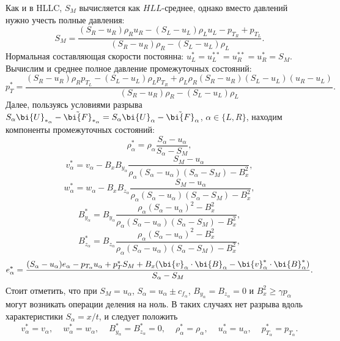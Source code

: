 \documentclass[12pt, a4paper]{article}
\begin{document}
 	Как и в HLLC, $S_M$ вычисляется как $HLL$-среднее, однако вместо давлений нужно учесть полные давления:
 	\[
 		S_M = 
 	\dfrac{(S_R - u_R)\rho_Ru_R - (S_L - u_L)\rho_Lu_L - p_{T_R} +p_{T_L}}{(S_R - u_R)\rho_R-(S_L - u_L)\rho_L}.
 	\]
 	Нормальная составляющая скорости постоянна: $u_L^* = u_L^{**} = u_R^{**} = u_R^* = S_M$. Вычислим и среднее полное давление промежуточных состояний:
 	\[
 	p_T^* = \dfrac{(S_R-u_R)\rho_Rp_{T_L} - (S_L-u_L)\rho_Lp_{T_R} +\rho_L\rho_R(S_R-u_R)(S_L-u_L)(u_R-u_L) }{(S_R-u_R)\rho_R-(S_L-u_L)\rho_L}.
 	\]
 	Далее, пользуясь условиями разрыва $S_\alpha\bi{U}_{*_\alpha} - \tilde{\bi{F}}_{*_\alpha} = S_\alpha\bi{U}_{\alpha} - \tilde{\bi{F}}_{\alpha}$, $\alpha\in\{L,R\}$, находим компоненты промежуточных состояний:
 	\[
 	\rho^*_\alpha = \rho_\alpha\dfrac{S_\alpha-u_\alpha}{S_\alpha-S_M},
 	\]
 	\[
 	v_\alpha^* = v_\alpha - B_xB_{y_\alpha}\dfrac{ S_M - u_\alpha }{ \rho_\alpha(S_\alpha -u_\alpha)(S_\alpha-S_M) - B_x^2 },
 	\]
 	\[
 	w_\alpha^* = w_\alpha - B_xB_{z_\alpha}\dfrac{ S_M - u_\alpha }{ \rho_\alpha(S_\alpha -u_\alpha)(S_\alpha-S_M) - B_x^2 },
 	\]
 	\[
 	B_{y_\alpha}^* = B_{y_\alpha} \dfrac{ \rho_\alpha(S_\alpha-u_\alpha)^2-B_x^2 }{\rho_\alpha(S_\alpha -u_\alpha)(S_\alpha-S_M) - B_x^2 },
 	\]
 		\[
 	B_{z_\alpha}^* = B_{z_\alpha} \dfrac{ \rho_\alpha(S_\alpha-u_\alpha)^2-B_x^2 }{\rho_\alpha(S_\alpha -u_\alpha)(S_\alpha-S_M) - B_x^2 },
 	\]
 	\[
 	e_\alpha^* = \dfrac{ (S_\alpha-u_\alpha)e_\alpha - p_{T_\alpha}u_\alpha + p_T^*S_M + B_x(\bi{v}_\alpha \cdot \bi{B}_\alpha - \bi{v}_\alpha^* \cdot \bi{B}_\alpha^* ) }{S_\alpha-S_M}.
 	\]
 	Стоит отметить, что при $S_M = u_\alpha$, $S_\alpha = u_\alpha \pm c_{f_\alpha}$, $B_{y_\alpha}=B_{z_\alpha} = 0$ и $B_x^2 \ge \gamma p_\alpha$ могут возникать операции деления на ноль. В таких случаях нет разрыва вдоль характеристики $S_\alpha = x/t$, и следует положить
 	\[
 	v_\alpha^* = v_\alpha, \phantom{xx} w_\alpha^* = w_\alpha, \phantom{xx} B_{y_\alpha}^*=B_{z_\alpha}^* = 0, \phantom{xx} \rho_\alpha^* = \rho_\alpha, \phantom{xx} u_\alpha^* = u_\alpha, \phantom{xx} p_{T_\alpha}^* = p_{T_\alpha}.
 	\]
 	
\end{document}
